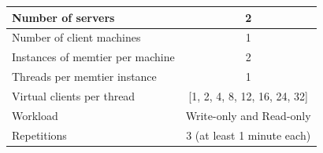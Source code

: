 \documentclass[11pt,a4paper]{article}
\begin{document}
\begin{center}
	\scriptsize{
		\begin{tabular}{|l|c|}
			\hline Number of servers                & 2                        \\ 
			\hline Number of client machines        & 1                        \\ 
			\hline Instances of memtier per machine & 2                        \\ 
			\hline Threads per memtier instance     & 1                        \\
			\hline Virtual clients per thread       & [1, 2, 4, 8, 12, 16, 24, 32]\\ 
			\hline Workload                         & Write-only and Read-only \\
			\hline Repetitions                      & 3 (at least 1 minute each) \\ 
			\hline 
		\end{tabular}
	} 
\end{center}
\end{document}

